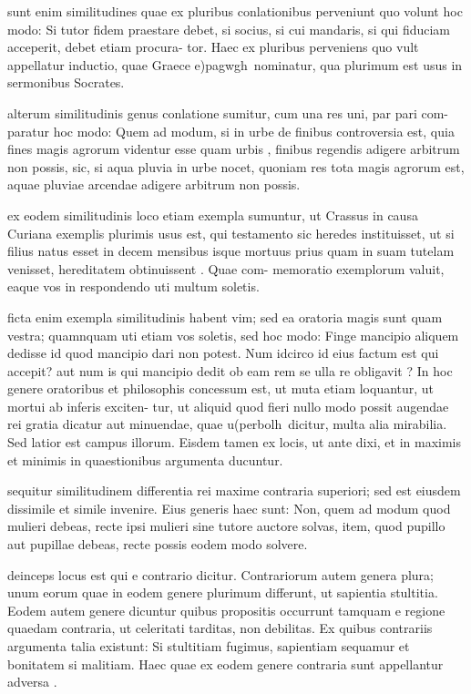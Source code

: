  sunt enim similitudines quae ex pluribus conlationibus perveniunt quo volunt hoc modo: Si tutor fidem praestare debet, si socius, si cui mandaris, si qui fiduciam acceperit, debet etiam procura- tor. Haec ex pluribus perveniens quo vult appellatur inductio, quae Graece e)pagwgh\ nominatur, qua plurimum est usus in sermonibus Socrates.

 alterum similitudinis genus conlatione sumitur, cum una res uni, par pari com- paratur hoc modo: Quem ad modum, si in urbe de finibus controversia est, quia fines magis agrorum videntur esse quam urbis , finibus regendis adigere arbitrum non possis, sic, si aqua pluvia in urbe nocet, quoniam res tota magis agrorum est, aquae pluviae arcendae adigere arbitrum non possis.

 ex eodem similitudinis loco etiam exempla sumuntur, ut Crassus in causa Curiana exemplis plurimis usus est, qui testamento sic heredes instituisset, ut si filius natus esset in decem mensibus isque mortuus prius quam in suam tutelam venisset, hereditatem obtinuissent . Quae com- memoratio exemplorum valuit, eaque vos in respondendo uti multum soletis.

 ficta enim exempla similitudinis habent vim; sed ea oratoria magis sunt quam vestra; quamnquam uti etiam vos soletis, sed hoc modo: Finge mancipio aliquem dedisse id quod mancipio dari non potest. Num idcirco id eius factum est qui accepit? aut num is qui mancipio dedit ob eam rem se ulla re obligavit ? In hoc genere oratoribus et philosophis concessum est, ut muta etiam loquantur, ut mortui ab inferis exciten- tur, ut aliquid quod fieri nullo modo possit augendae rei gratia dicatur aut minuendae, quae u(perbolh\ dicitur, multa alia mirabilia. Sed latior est campus illorum. Eisdem tamen ex locis, ut ante dixi, et in maximis et minimis in quaestionibus argumenta ducuntur.

 sequitur similitudinem differentia rei maxime contraria superiori; sed est eiusdem dissimile et simile invenire. Eius generis haec sunt: Non, quem ad modum quod mulieri debeas, recte ipsi mulieri sine tutore auctore solvas, item, quod pupillo aut pupillae debeas, recte possis eodem modo solvere.

 deinceps locus est qui e contrario dicitur. Contrariorum autem genera plura; unum eorum quae in eodem genere plurimum differunt, ut sapientia stultitia. Eodem autem genere dicuntur quibus propositis occurrunt tamquam e regione quaedam contraria, ut celeritati tarditas, non debilitas. Ex quibus contrariis argumenta talia existunt: Si stultitiam fugimus, sapientiam sequamur et bonitatem si malitiam. Haec quae ex eodem genere contraria sunt appellantur adversa .

